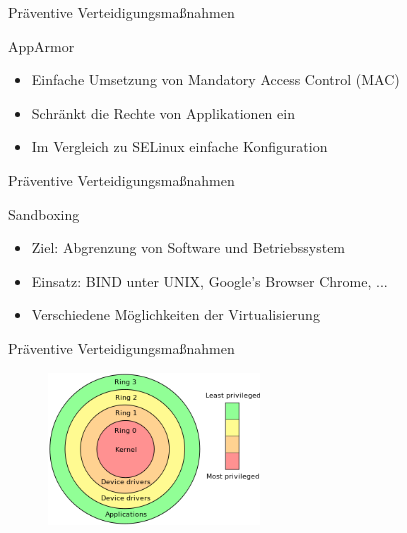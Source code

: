 \begin{frame}{Präventive Verteidigungsmaßnahmen}
        \begin{block}{AppArmor}
                \begin{itemize}[<+->]
                        \item Einfache Umsetzung von Mandatory Access Control (MAC)
                        \item Schränkt die Rechte von Applikationen ein
                        \item Im Vergleich zu SELinux einfache Konfiguration
                \end{itemize}
        \end{block}
\end{frame}

\begin{frame}{Präventive Verteidigungsmaßnahmen}
        \begin{block}{Sandboxing}
                \begin{itemize}[<+->]
                        \item Ziel: Abgrenzung von Software und Betriebssystem
                        \item Einsatz: BIND unter UNIX, Google's Browser Chrome, ...
                        \item Verschiedene Möglichkeiten der Virtualisierung
                \end{itemize}
        \end{block}
\end{frame}

\begin{frame}{Präventive Verteidigungsmaßnahmen}
        \begin{figure}
                \centering
                \includegraphics[width=0.5\textwidth]{assets/priv_rings}
        \end{figure}
\end{frame}

